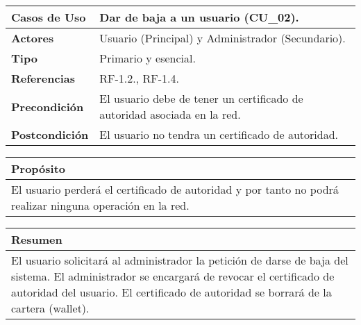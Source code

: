 \begin{itemize}
    \begin{table}[h!]
        \centering
        \begin{tabular}{|l|p{}|}
            \hline
            \textbf{Casos de Uso}   &   Dar de baja a un usuario (CU\_02). \\
            \hline 
            \textbf{Actores}        &   Usuario (Principal) y Administrador (Secundario). \\ 
            \hline 
            \textbf{Tipo}           &   Primario y esencial. \\
            \hline
            \textbf{Referencias}    &   RF-1.2., RF-1.4.\\ 
            \hline
            \textbf{Precondición}   &   El usuario debe de tener un certificado de autoridad asociada en la red.\\ 
            \hline
            \textbf{Postcondición}  &   El usuario no tendra un certificado de autoridad.\\ 
            \hline
        \end{tabular}
        
        \vspace{5mm}
        
        \begin{tabular}{|p{\textwidth}|}
            \hline
            \rowcolor{SeaGreen} \textbf{Propósito} \\
            \hline
            \multicolumn{1}{|p{12cm}|}{El usuario perderá el certificado de autoridad y por tanto no podrá realizar
            ninguna operación en la red.} \\ [0.5ex]
            \hline
        \end{tabular}
        
        \vspace{5mm}
        
        \begin{tabular}{|p{\textwidth}|}
            \hline
            \rowcolor{SeaGreen} \textbf{Resumen} \\
            \hline
            \multicolumn{1}{|p{12cm}|}{El usuario solicitará al administrador la petición de darse de baja del sistema. El administrador
            se encargará de revocar el certificado de autoridad del usuario. El certificado de autoridad se borrará de la cartera (wallet).} \\ [0.5ex]
            \hline
        \end{tabular}
        

\end{table}
\end{itemize}
